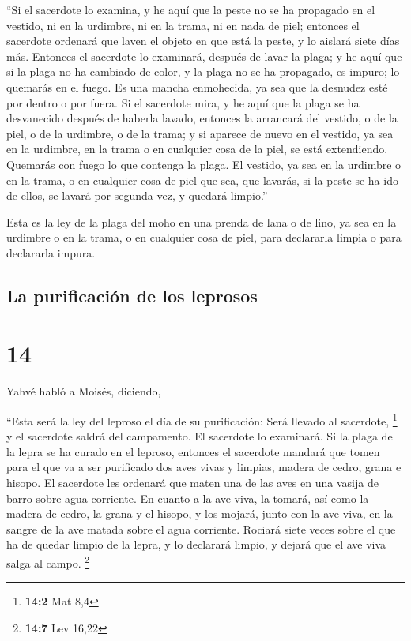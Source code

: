  ``Si el sacerdote lo examina, y he aquí que la peste no
se ha propagado en el vestido, ni en la urdimbre, ni en la trama, ni en
nada de piel;  entonces el sacerdote ordenará que laven
el objeto en que está la peste, y lo aislará siete días más.
 Entonces el sacerdote lo examinará, después de lavar la
plaga; y he aquí que si la plaga no ha cambiado de color, y la plaga no
se ha propagado, es impuro; lo quemarás en el fuego. Es una mancha
enmohecida, ya sea que la desnudez esté por dentro o por fuera.
 Si el sacerdote mira, y he aquí que la plaga se ha
desvanecido después de haberla lavado, entonces la arrancará del
vestido, o de la piel, o de la urdimbre, o de la trama; 
y si aparece de nuevo en el vestido, ya sea en la urdimbre, en la trama
o en cualquier cosa de la piel, se está extendiendo. Quemarás con fuego
lo que contenga la plaga.  El vestido, ya sea en la
urdimbre o en la trama, o en cualquier cosa de piel que sea, que
lavarás, si la peste se ha ido de ellos, se lavará por segunda vez, y
quedará limpio.''

 Esta es la ley de la plaga del moho en una prenda de
lana o de lino, ya sea en la urdimbre o en la trama, o en cualquier cosa
de piel, para declararla limpia o para declararla impura.

\hypertarget{la-purificaciuxf3n-de-los-leprosos}{%
\subsection{La purificación de los
leprosos}\label{la-purificaciuxf3n-de-los-leprosos}}

\hypertarget{section-13}{%
\section{14}\label{section-13}}

 Yahvé habló a Moisés, diciendo,

 ``Esta será la ley del leproso el día de su purificación:
Será llevado al sacerdote, \footnote{\textbf{14:2} Mat 8,4}
 y el sacerdote saldrá del campamento. El sacerdote lo
examinará. Si la plaga de la lepra se ha curado en el leproso,
 entonces el sacerdote mandará que tomen para el que va a
ser purificado dos aves vivas y limpias, madera de cedro, grana e
hisopo.  El sacerdote les ordenará que maten una de las
aves en una vasija de barro sobre agua corriente.  En
cuanto a la ave viva, la tomará, así como la madera de cedro, la grana y
el hisopo, y los mojará, junto con la ave viva, en la sangre de la ave
matada sobre el agua corriente.  Rociará siete veces sobre
el que ha de quedar limpio de la lepra, y lo declarará limpio, y dejará
que el ave viva salga al campo. \footnote{\textbf{14:7} Lev 16,22}

